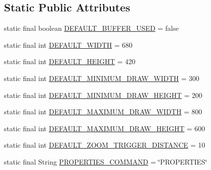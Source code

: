 \subsection*{Static Public Attributes}
\begin{DoxyCompactItemize}
\item 
static final boolean \mbox{\hyperlink{classorg_1_1jfree_1_1experimental_1_1chart_1_1swt_1_1_chart_composite_abe10adc50bd71c6e26f0908b37199f49}{D\+E\+F\+A\+U\+L\+T\+\_\+\+B\+U\+F\+F\+E\+R\+\_\+\+U\+S\+ED}} = false
\item 
static final int \mbox{\hyperlink{classorg_1_1jfree_1_1experimental_1_1chart_1_1swt_1_1_chart_composite_a1896a25dbd1e8600189f44a222240cfd}{D\+E\+F\+A\+U\+L\+T\+\_\+\+W\+I\+D\+TH}} = 680
\item 
static final int \mbox{\hyperlink{classorg_1_1jfree_1_1experimental_1_1chart_1_1swt_1_1_chart_composite_a947cfb7afb3824c38224de3d7a9b31d0}{D\+E\+F\+A\+U\+L\+T\+\_\+\+H\+E\+I\+G\+HT}} = 420
\item 
static final int \mbox{\hyperlink{classorg_1_1jfree_1_1experimental_1_1chart_1_1swt_1_1_chart_composite_a11c8bf1ba25179a116911cb5d5c8051d}{D\+E\+F\+A\+U\+L\+T\+\_\+\+M\+I\+N\+I\+M\+U\+M\+\_\+\+D\+R\+A\+W\+\_\+\+W\+I\+D\+TH}} = 300
\item 
static final int \mbox{\hyperlink{classorg_1_1jfree_1_1experimental_1_1chart_1_1swt_1_1_chart_composite_aed372f32269e4336717ab95858e4ed55}{D\+E\+F\+A\+U\+L\+T\+\_\+\+M\+I\+N\+I\+M\+U\+M\+\_\+\+D\+R\+A\+W\+\_\+\+H\+E\+I\+G\+HT}} = 200
\item 
static final int \mbox{\hyperlink{classorg_1_1jfree_1_1experimental_1_1chart_1_1swt_1_1_chart_composite_a5e5b48c1a0edf0a3ffe3f2e996caca6b}{D\+E\+F\+A\+U\+L\+T\+\_\+\+M\+A\+X\+I\+M\+U\+M\+\_\+\+D\+R\+A\+W\+\_\+\+W\+I\+D\+TH}} = 800
\item 
static final int \mbox{\hyperlink{classorg_1_1jfree_1_1experimental_1_1chart_1_1swt_1_1_chart_composite_a42ec7955309a35e9a15425941f0aa835}{D\+E\+F\+A\+U\+L\+T\+\_\+\+M\+A\+X\+I\+M\+U\+M\+\_\+\+D\+R\+A\+W\+\_\+\+H\+E\+I\+G\+HT}} = 600
\item 
static final int \mbox{\hyperlink{classorg_1_1jfree_1_1experimental_1_1chart_1_1swt_1_1_chart_composite_a16c62cc66993dda35b136fc74a5eb912}{D\+E\+F\+A\+U\+L\+T\+\_\+\+Z\+O\+O\+M\+\_\+\+T\+R\+I\+G\+G\+E\+R\+\_\+\+D\+I\+S\+T\+A\+N\+CE}} = 10
\item 
static final String \mbox{\hyperlink{classorg_1_1jfree_1_1experimental_1_1chart_1_1swt_1_1_chart_composite_a979b589eb409439329bf62fa758a89ae}{P\+R\+O\+P\+E\+R\+T\+I\+E\+S\+\_\+\+C\+O\+M\+M\+A\+ND}} = \char`\"{}P\+R\+O\+P\+E\+R\+T\+I\+ES\char`\"{}

\end{DoxyCompactItemize}
